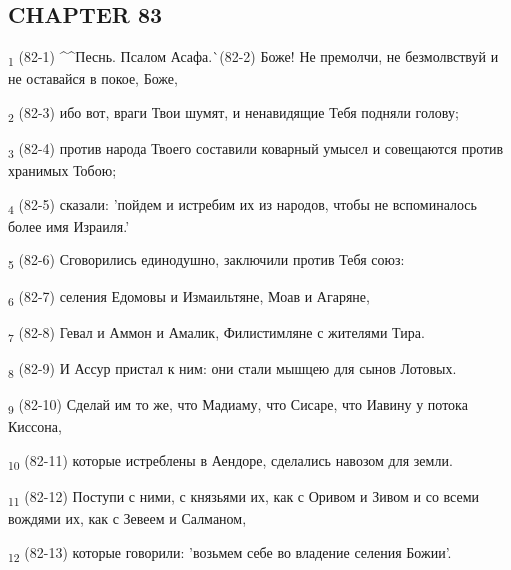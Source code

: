 \subsection{CHAPTER 83}
\begin{tcolorbox}
\textsubscript{1} (82-1) ^^Песнь. Псалом Асафа.^^ (82-2) Боже! Не премолчи, не безмолвствуй и не оставайся в покое, Боже,
\end{tcolorbox}
\begin{tcolorbox}
\textsubscript{2} (82-3) ибо вот, враги Твои шумят, и ненавидящие Тебя подняли голову;
\end{tcolorbox}
\begin{tcolorbox}
\textsubscript{3} (82-4) против народа Твоего составили коварный умысел и совещаются против хранимых Тобою;
\end{tcolorbox}
\begin{tcolorbox}
\textsubscript{4} (82-5) сказали: 'пойдем и истребим их из народов, чтобы не вспоминалось более имя Израиля.'
\end{tcolorbox}
\begin{tcolorbox}
\textsubscript{5} (82-6) Сговорились единодушно, заключили против Тебя союз:
\end{tcolorbox}
\begin{tcolorbox}
\textsubscript{6} (82-7) селения Едомовы и Измаильтяне, Моав и Агаряне,
\end{tcolorbox}
\begin{tcolorbox}
\textsubscript{7} (82-8) Гевал и Аммон и Амалик, Филистимляне с жителями Тира.
\end{tcolorbox}
\begin{tcolorbox}
\textsubscript{8} (82-9) И Ассур пристал к ним: они стали мышцею для сынов Лотовых.
\end{tcolorbox}
\begin{tcolorbox}
\textsubscript{9} (82-10) Сделай им то же, что Мадиаму, что Сисаре, что Иавину у потока Киссона,
\end{tcolorbox}
\begin{tcolorbox}
\textsubscript{10} (82-11) которые истреблены в Аендоре, сделались навозом для земли.
\end{tcolorbox}
\begin{tcolorbox}
\textsubscript{11} (82-12) Поступи с ними, с князьями их, как с Оривом и Зивом и со всеми вождями их, как с Зевеем и Салманом,
\end{tcolorbox}
\begin{tcolorbox}
\textsubscript{12} (82-13) которые говорили: 'возьмем себе во владение селения Божии'.
\end{tcolorbox}
